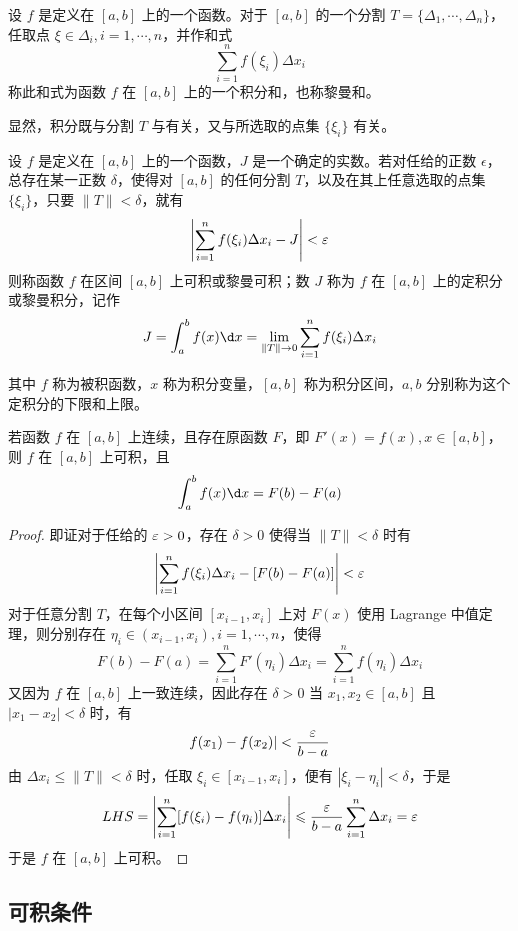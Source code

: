 \begin{definition}
	设 $f$ 是定义在 $[a,b]$ 上的一个函数。对于 $[a,b]$ 的一个分割 $T=\{\Delta_1,\cdots,\Delta_n\}$，任取点 $\xi\in\Delta_i,i=1,\cdots,n$，并作和式
	$$\sum_{i=1}^nf(\xi_i)\Delta x_i$$
	称此和式为函数 $f$ 在 $[a,b]$ 上的一个积分和，也称黎曼和。
\end{definition}

显然，积分既与分割 $T$ 与有关，又与所选取的点集 $\{\xi_i\}$ 有关。

\begin{definition}
	设 $f$ 是定义在 $[a,b]$ 上的一个函数，$J$ 是一个确定的实数。若对任给的正数 $\epsilon$，总存在某一正数 $\delta$，使得对 $[a,b]$ 的任何分割 $T$，以及在其上任意选取的点集 $\{\xi_i\}$，只要 $\| T \| < \delta$，就有
	$$\left| \sum_{i=1}^nf(\xi_i)\Delta x_i - J \right| < \varepsilon$$
	则称函数 $f$ 在区间 $[a,b]$ 上可积或黎曼可积；数 $J$ 称为 $f$ 在 $[a,b]$ 上的定积分或黎曼积分，记作
	$$J = \int_a^b f(x) \d x = \lim_{\| T \| \to 0} \sum_{i=1}^nf(\xi_i)\Delta x_i$$
\end{definition}

其中 $f$ 称为被积函数，$x$ 称为积分变量，$[a,b]$ 称为积分区间，$a,b$ 分别称为这个定积分的下限和上限。

\begin{theorem}
	若函数 $f$ 在 $[a,b]$ 上连续，且存在原函数 $F$，即 $F'(x) = f(x), x\in[a,b]$，则 $f$ 在 $[a,b]$ 上可积，且
	$$\int_a^bf(x)\d x = F(b) - F(a)$$
\end{theorem}

\begin{proof}
	即证对于任给的 $\varepsilon > 0$，存在 $\delta>0$ 使得当 $\| T \| < \delta$ 时有
	$$\left| \sum_{i=1}^nf(\xi_i)\Delta x_i - [F(b)-F(a)] \right| < \varepsilon$$
	对于任意分割 $T$，在每个小区间 $[x_{i-1},x_i]$ 上对 $F(x)$ 使用 Lagrange 中值定理，则分别存在 $\eta_i \in (x_{i-1},x_i),i=1,\cdots,n$，使得
	$$F(b)-F(a) = \sum_{i=1}^n F'(\eta_i)\Delta x_i = \sum_{i=1}^nf(\eta_i)\Delta x_i$$
	又因为 $f$ 在 $[a,b]$ 上一致连续，因此存在 $\delta > 0$ 当 $x_1,x_2\in[a,b]$ 且 $|x_1-x_2| < \delta$ 时，有
	$$f(x_1) - f(x_2)| < \frac{\varepsilon}{b-a}$$
	由 $\Delta x_i \leqslant \| T \| < \delta$ 时，任取 $\xi_i \in [x_{i-1},x_i]$，便有 $|\xi_i-\eta_i|<\delta$，于是
	$$LHS = \left| \sum_{i=1}^n [f(\xi_i)-f(\eta_i)]\Delta x_i \right| \leqslant \frac{\varepsilon}{b-a}\sum_{i=1}^n\Delta x_i = \varepsilon$$
	于是 $f$ 在 $[a,b]$ 上可积。
\end{proof}

\subsection{可积条件}

